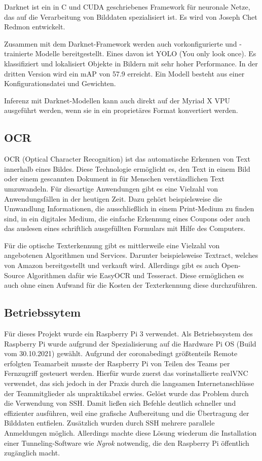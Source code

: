 Darknet ist ein in C und CUDA geschriebenes Framework für neuronale Netze, das auf die Verarbeitung von Bilddaten spezialisiert ist. Es wird von Joseph Chet Redmon entwickelt. \autocite[Vgl.][]{darknet13}

Zusammen mit dem Darknet-Framework werden auch vorkonfigurierte und -trainierte Modelle bereitgestellt. Eines davon ist YOLO (You only look once). Es klassifiziert und lokalisiert Objekte in Bildern mit sehr hoher Performance. In der dritten Version wird ein mAP von 57.9 erreicht. Ein Modell besteht aus einer Konfigurationsdatei und Gewichten. \autocite[Vgl.][]{yolov3} %

Inferenz mit Darknet-Modellen kann auch direkt auf der Myriad X VPU ausgeführt werden, wenn sie in ein proprietäres Format konvertiert werden.


\subsection{OCR}
OCR (Optical Character Recognition) ist das automatische Erkennen von Text innerhalb eines Bildes. Diese Technologie ermöglicht es, den Text in einem Bild oder einem gescannten Dokument in für Menschen verständlichen Text umzuwandeln. Für diesartige Anwendungen gibt es eine Vielzahl von Anwendungsfällen in der heutigen Zeit. Dazu gehört beispielsweise die Umwandlung Informationen, die ausschließlich in einem Print-Medium zu finden sind, in ein digitales Medium, die einfache Erkennung eines Coupons oder auch das auslesen eines schriftlich ausgefüllten Formulars mit Hilfe des Computers.\autocite[Vgl.][S. 81]{ocr1}

Für die optische Texterkennung gibt es mittlerweile eine Vielzahl von angebotenen Algorithmen und Services. Darunter beispielsweise Textract, welches von Amazon bereitgestellt und verkauft wird. Allerdings gibt es auch Open-Source Algorithmen dafür wie EasyOCR und Tesseract. Diese ermöglichen es auch ohne einen Aufwand für die Kosten der Texterkennung diese durchzuführen.

\subsection{Betriebssytem}
Für dieses Projekt wurde ein Raspberry Pi 3 verwendet. Als Betriebssystem des Raspberry Pi wurde aufgrund der Spezialisierung auf die Hardware Pi OS (Build vom 30.10.2021) gewählt. Aufgrund der coronabedingt größtenteils Remote erfolgten Teamarbeit musste der Raspberry Pi von Teilen des Teams per Fernzugriff gesteuert werden. Hierfür wurde zuerst das vorinstallierte realVNC verwendet, das sich jedoch in der Praxis durch die langsamen Internetanschlüsse der Teammitglieder als unpraktikabel erwies. Gelöst wurde das Problem durch die Verwendung von SSH. Damit ließen sich Befehle deutlich schneller und effizienter ausführen, weil eine grafische Aufbereitung und die Übertragung der Bilddaten entfielen. Zusätzlich wurden durch SSH mehrere parallele Anmeldungen möglich. Allerdings machte diese Lösung wiederum die Installation einer Tunneling-Software wie \textit{Ngrok} notwendig, die den Raspberry Pi öffentlich zugänglich macht. 

